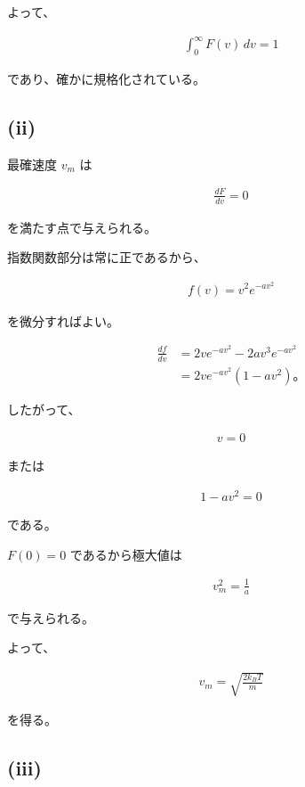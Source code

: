 \documentclass[platex,dvipdfmx,a4paper]{jsarticle}
\begin{document}
よって、

\begin{align*}
\int_0^\infty F(v)\,dv=1
\end{align*}

であり、確かに規格化されている。

\subsection{(ii)}

最確速度 $v_m$ は

\begin{align*}
\frac{dF}{dv}=0
\end{align*}

を満たす点で与えられる。

指数関数部分は常に正であるから、

\begin{align*}
f(v)=v^2e^{-av^2}
\end{align*}

を微分すればよい。

\begin{align*}
\frac{df}{dv}
&=
2ve^{-av^2}
-2av^3e^{-av^2} \\
&=
2ve^{-av^2}(1-av^2)。
\end{align*}

したがって、

\begin{align*}
v=0
\end{align*}

または

\begin{align*}
1-av^2=0
\end{align*}

である。

$F(0)=0$ であるから極大値は

\begin{align*}
v_m^2=\frac1a
\end{align*}

で与えられる。

よって、

\begin{align*}
v_m
=
\sqrt{\frac{2k_BT}{m}}
\end{align*}

を得る。

\subsection{(iii)}
\end{document}
